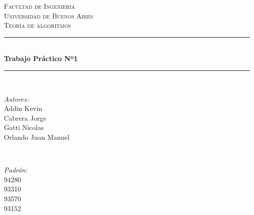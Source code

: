 \begin{titlepage}

\newcommand{\HRule}{\rule{\linewidth}{0.5mm}} %

\center %
 

\textsc{\LARGE Facultad de Ingeniería\\Universidad de Buenos Aires}\\[1.5cm] %
\textsc{\Large Teoría de algoritmos}\\[0.5cm] %


\HRule \\[0.4cm]
{ \huge \bfseries Trabajo Práctico Nº1}\\[0.4cm] %
\HRule \\[1.5cm]
 

\begin{minipage}{0.4\textwidth}
\begin{flushleft} \large
\emph{Autores:}\\
Addin Kevin\\
Cabrera Jorge\\
Gatti Nicolas\\
Orlando Juan Manuel
\end{flushleft}
\end{minipage}
~
\begin{minipage}{0.4\textwidth}
\begin{flushright} \large
\emph{Padrón:} \\
94280\\
93310\\
93570\\
93152
\end{flushright}
\end{minipage}\\[1cm]


\end{titlepage}
